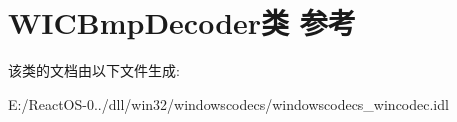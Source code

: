 \hypertarget{class_w_i_c_bmp_decoder}{}\section{W\+I\+C\+Bmp\+Decoder类 参考}
\label{class_w_i_c_bmp_decoder}


该类的文档由以下文件生成\+:\begin{DoxyCompactItemize}
\item 
E\+:/\+React\+O\+S-\/0../dll/win32/windowscodecs/windowscodecs\+\_\+wincodec.\+idl\end{DoxyCompactItemize}
